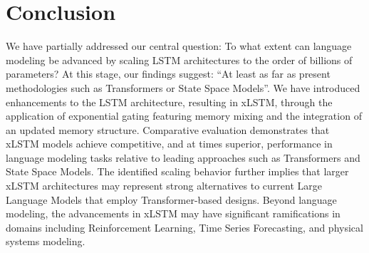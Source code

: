 \section{Conclusion}
We have partially addressed our central question: To what extent can language modeling be advanced by scaling LSTM architectures to the order of billions of parameters? At this stage, our findings suggest: ``At least as far as present methodologies such as Transformers or State Space Models''. We have introduced enhancements to the LSTM architecture, resulting in xLSTM, through the application of exponential gating featuring memory mixing and the integration of an updated memory structure. Comparative evaluation demonstrates that xLSTM models achieve competitive, and at times superior, performance in language modeling tasks relative to leading approaches such as Transformers and State Space Models. The identified scaling behavior further implies that larger xLSTM architectures may represent strong alternatives to current Large Language Models that employ Transformer-based designs. Beyond language modeling, the advancements in xLSTM may have significant ramifications in domains including Reinforcement Learning, Time Series Forecasting, and physical systems modeling.

